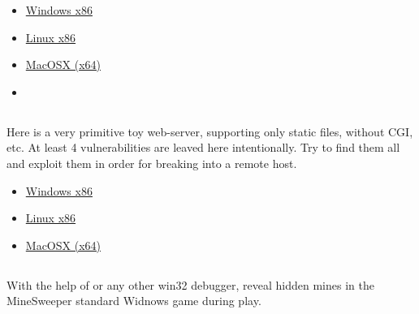 \begin{itemize}
\item
\href{http://yurichev.com/RE-exercises/middle/5/super_mega_protection.exe}{Windows x86}

\item
\href{http://yurichev.com/RE-exercises/middle/5/super_mega_protection.tar}{Linux x86}

\item
\href{http://yurichev.com/RE-exercises/middle/5/super_mega_protection_MacOSX.tar}{MacOSX (x64)}

\item
\href{http://yurichev.com/RE-exercises/middle/5/sample.key}{}
\end{itemize}

\subsection{}

{Here is a very primitive toy web-server, supporting only static files, without \ac{CGI}, etc}.
{At least 4 vulnerabilities are leaved here intentionally}.
{Try to find them all and exploit them in order for breaking into a remote host}.

\begin{itemize}
\item
\href{http://yurichev.com/RE-exercises/middle/6/webserv_win32.rar}{Windows x86}

\item
\href{http://yurichev.com/RE-exercises/middle/6/webserv_Linux_x86.tar}{Linux x86}

\item
\href{http://yurichev.com/RE-exercises/middle/6/webserv_MacOSX_x64.tar}{MacOSX (x64)}
\end{itemize}

\subsection{}

{With the help of \tracer or any other win32 debugger, reveal hidden mines in the MineSweeper standard Widnows game
during play}.

